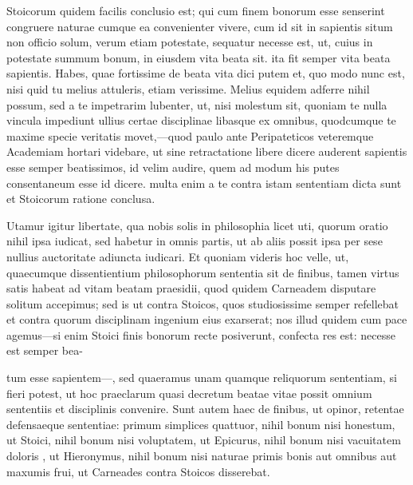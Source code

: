  Stoicorum quidem facilis conclusio est; qui cum finem bonorum esse senserint congruere naturae cumque ea convenienter vivere, cum id sit in sapientis situm non officio solum, verum etiam potestate, sequatur necesse est, ut, cuius in potestate summum bonum, in eiusdem vita beata sit. ita fit semper vita beata sapientis. Habes, quae fortissime de beata vita dici putem et, quo modo nunc est, nisi quid tu melius attuleris, etiam verissime. Melius equidem adferre nihil possum, sed a te impetrarim lubenter, ut, nisi molestum sit, quoniam te nulla vincula impediunt ullius certae disciplinae libasque ex omnibus, quodcumque te maxime specie veritatis movet,—quod paulo ante Peripateticos veteremque Academiam hortari videbare, ut sine retractatione libere dicere auderent sapientis esse semper beatissimos, id velim audire, quem ad modum his putes consentaneum esse id dicere. multa enim a te contra istam sententiam dicta sunt et Stoicorum ratione conclusa.

 Utamur igitur libertate, qua nobis solis in philosophia licet uti, quorum oratio nihil ipsa iudicat, sed habetur in omnis partis, ut ab aliis possit ipsa per sese nullius auctoritate adiuncta iudicari. Et quoniam videris hoc velle, ut, quaecumque dissentientium philosophorum sententia sit de finibus, tamen virtus satis habeat ad vitam beatam praesidii, quod quidem Carneadem disputare solitum accepimus; sed is ut contra Stoicos, quos studiosissime semper refellebat et contra quorum disciplinam ingenium eius exarserat; nos illud quidem cum pace agemus—si enim Stoici finis bonorum recte posiverunt, confecta res est: necesse est semper bea-

 tum esse sapientem—, sed quaeramus unam quamque reliquorum sententiam, si fieri potest, ut hoc praeclarum quasi decretum beatae vitae possit omnium sententiis et disciplinis convenire. Sunt autem haec de finibus, ut opinor, retentae defensaeque sententiae: primum simplices quattuor, nihil bonum nisi honestum, ut Stoici, nihil bonum nisi voluptatem, ut Epicurus, nihil bonum nisi vacuitatem doloris , ut Hieronymus, nihil bonum nisi naturae primis bonis aut omnibus aut maxumis frui, ut Carneades contra Stoicos disserebat.

